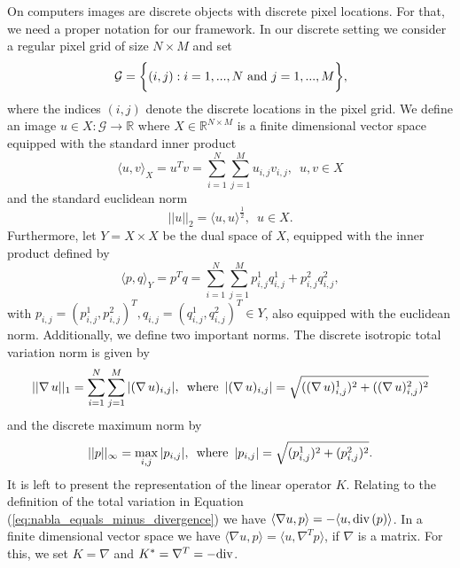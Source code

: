\documentclass[abstracton]{scrreprt}
\begin{document}
        On computers images are discrete objects with discrete pixel locations. For that, we need a proper notation for our framework. In our discrete setting we consider a regular pixel grid of size $N \times M$ and set
            \begin{equation}
                \mathcal{G} = \bigg\{ (i, j) : i = 1, ..., N \,\, \textnormal{and} \,\, j = 1, ..., M \bigg\},
                \label{eq:pixel_grid}
            \end{equation}
        where the indices $(i, j)$ denote the discrete locations in the pixel grid. We define an image $u \in X: \mathcal{G} \longrightarrow \mathbb{R}$ where $X \in \mathbb{R}^{N \times M}$ is a finite dimensional vector space equipped with the standard inner product
            \begin{equation}
                \langle u, v \rangle_{X} = u^{T}v = \sum_{i = 1}^{N} \sum_{j = 1}^{M} u_{i, j} v_{i, j}, \,\,\, u, v \in X
                \label{eq:inner_product}
            \end{equation}
        and the standard euclidean norm
            $$
                ||u||_{2} = \langle u, u \rangle^{\frac{1}{2}}, \,\,\, u \in X.
            $$
        Furthermore, let $Y = X \times X$ be the dual space of $X$, equipped with the inner product defined by
            \begin{equation}
                \langle p, q \rangle_{Y} = p^{T}q = \sum_{i = 1}^{N} \sum_{j = 1}^{M} p^{1}_{i, j} q^{1}_{i, j} + p^{2}_{i, j} q^{2}_{i, j},
                \label{eq:inner_product_space_y}
            \end{equation}
        with $p_{i, j} = \left(p^{1}_{i, j}, p^{2}_{i, j}\right)^{T}, q_{i, j} = \left(q^{1}_{i, j}, q^{2}_{i, j}\right)^{T} \in Y$, also equipped with the euclidean norm. Additionally, we define two important norms. The discrete isotropic total variation norm is given by
            $$
                ||\nabla \, u||_{1} = \sum_{i = 1}^{N} \sum_{j = 1}^{M} |(\nabla \, u)_{i, j}|, \,\,\, \textnormal{where} \,\,\, |(\nabla \, u)_{i, j}| = \sqrt{((\nabla \, u)^{1}_{i, j})^{2} + ((\nabla \, u)^{2}_{i, j})^{2}}
            $$
        and the discrete maximum norm by
            $$
                ||p||_{\infty} = \max_{i, j} |p_{i, j}|, \,\,\, \textnormal{where} \,\,\, |p_{i, j}| = \sqrt{(p^{1}_{i, j})^{2} + (p^{2}_{i, j})^{2}}.
            $$
        It is left to present the representation of the linear operator $K$. Relating to the definition of the total variation in Equation (\ref{eq:nabla_equals_minus_divergence}) we have $\langle \nabla u, p \rangle = - \langle u, \textnormal{div}\,(p) \rangle$. In a finite dimensional vector space we have $\langle \nabla u, p \rangle = \langle u, \nabla^{T} p \rangle$, if $\nabla$ is a matrix. For this, we set $K = \nabla$ and $K^{\ast} = \nabla^{T} = -\textnormal{div}$.
\end{document}
